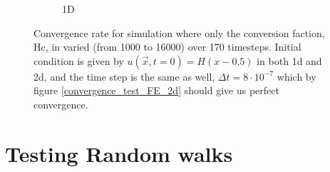 \begin{figure}[H]
\begin{subfigure}[b]{0.48\textwidth}
  \caption{1D}
  \label{Convergence_rate_diffusion_with_walk:1d}
 \end{subfigure}
 \caption[Convergence test for combined simulation]{Convergence rate for simulation where only the conversion faction, Hc, in varied (from 1000 to 16000) over 170 timesteps. Initial condition is given by $u(\vec{x},t=0) = H(x-0.5)$ in both 1d and 2d, and the time step is the same as well, $\Delta t = 8\cdot10^{-7}$ which by figure \ref{convergence_test_FE_2d} should give us perfect convergence.}
 \label{Convergence_rate_diffusion_with_walk}
\end{figure}


\section{Testing Random walks}\label{testing_random_walks}

